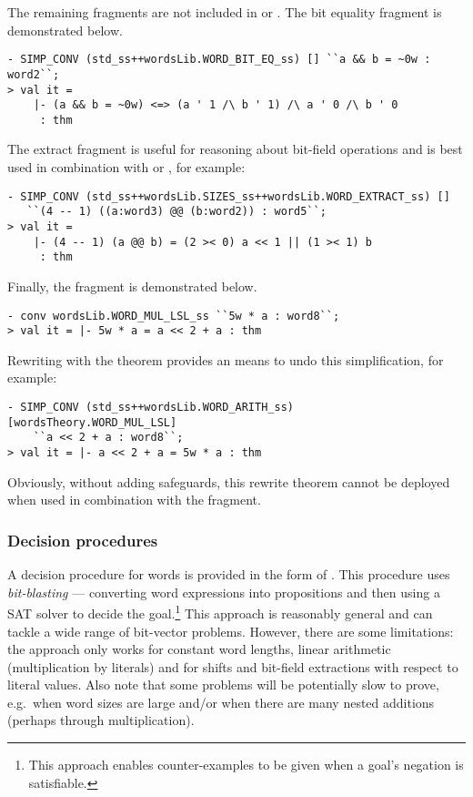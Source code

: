 The remaining fragments are not included in  or .  The bit equality fragment is demonstrated below.
\begin{session}
\begin{verbatim}
- SIMP_CONV (std_ss++wordsLib.WORD_BIT_EQ_ss) [] ``a && b = ~0w : word2``;
> val it =
    |- (a && b = ~0w) <=> (a ' 1 /\ b ' 1) /\ a ' 0 /\ b ' 0
     : thm
\end{verbatim}
\end{session}
The extract fragment is useful for reasoning about bit-field operations and is best used in combination with  or , for example:
\begin{session}
\begin{verbatim}
- SIMP_CONV (std_ss++wordsLib.SIZES_ss++wordsLib.WORD_EXTRACT_ss) []
   ``(4 -- 1) ((a:word3) @@ (b:word2)) : word5``;
> val it =
    |- (4 -- 1) (a @@ b) = (2 >< 0) a << 1 || (1 >< 1) b
     : thm
\end{verbatim}
\end{session}
Finally, the fragment  is demonstrated below.
\begin{session}
\begin{verbatim}
- conv wordsLib.WORD_MUL_LSL_ss ``5w * a : word8``;
> val it = |- 5w * a = a << 2 + a : thm
\end{verbatim}
\end{session}
Rewriting with the theorem  provides an means to undo this simplification, for example:
\begin{session}
\begin{verbatim}
- SIMP_CONV (std_ss++wordsLib.WORD_ARITH_ss) [wordsTheory.WORD_MUL_LSL]
    ``a << 2 + a : word8``;
> val it = |- a << 2 + a = 5w * a : thm
\end{verbatim}
\end{session}
Obviously, without adding safeguards, this rewrite theorem cannot be deployed when used in combination with the  fragment.

\subsubsection{Decision procedures}

A decision procedure for words is provided in the form of
.  This procedure uses \emph{bit-blasting} ---
converting word expressions into propositions and then using a SAT solver to
decide the goal.\footnote{This approach enables counter-examples to be given
when a goal's negation is satisfiable.} This approach is reasonably general and
can tackle a wide range of bit-vector problems.  However, there are some
limitations: the approach only works for constant word lengths, linear
arithmetic (multiplication by literals) and for shifts and bit-field
extractions with respect to literal values.  Also note that some problems will
be potentially slow to prove, e.g.\ when word sizes are large and/or when
there are many nested additions (perhaps through multiplication).

